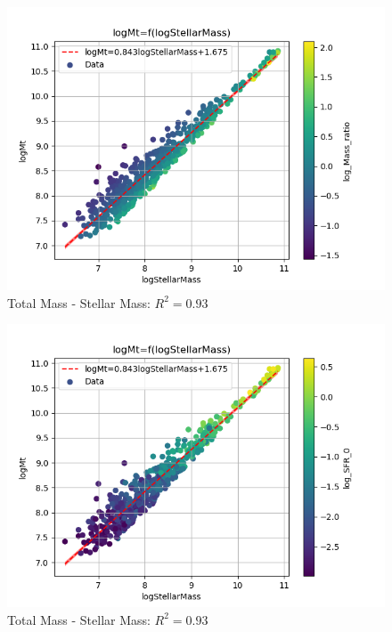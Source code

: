 \documentclass[a4paper]{article}
\begin{document}
\begin{figure}[htbp]
\centering
\includegraphics[width=.9\linewidth]{./graphs/logStellarMass-logMtcolor_log_Mass_ratio.png}
\caption{\label{Total Mass - Stellar Mass}Total Mass - Stellar Mass: \(R^2=0.93\)}
\end{figure}
\begin{figure}[htbp]
\centering
\includegraphics[width=.9\linewidth]{./graphs/logStellarMass-logMtcolor_log_SFR_0.png}
\caption{\label{Total Mass - Stellar Mass}Total Mass - Stellar Mass: \(R^2=0.93\)}
\end{figure}
\end{document}

